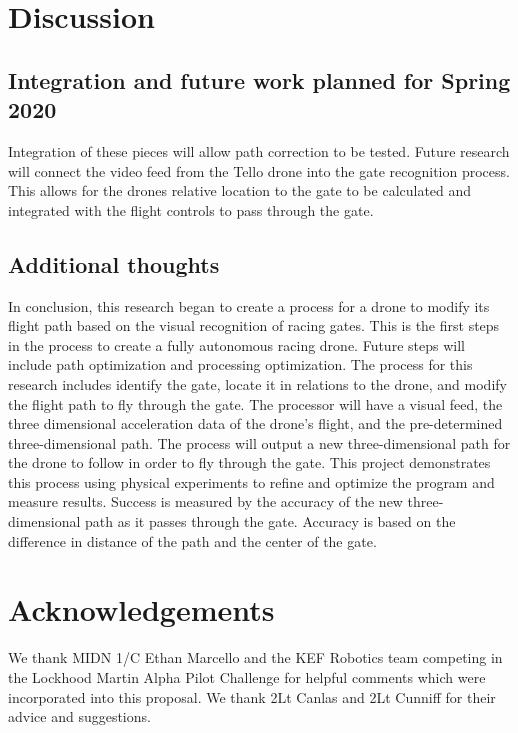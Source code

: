 \documentclass[onecolumn,10pt]{IEEEtran}
\begin{document}
\section{Discussion}
\subsection{Integration and future work planned for Spring 2020}
Integration of these pieces will allow path correction to be tested. Future research will connect the video feed from the Tello drone into the gate recognition process. This allows for the drones relative location to the gate to be calculated and integrated with the flight controls to pass through the gate.

\subsection{Additional thoughts}
In conclusion, this research began to create a process for a drone to modify its flight path based on the visual recognition of racing gates. This is the first steps in the process to create a fully autonomous racing drone. Future steps will include path optimization and processing optimization. The process for this research includes identify the gate, locate it in relations to the drone, and modify the flight path to fly through the gate. The processor will have a visual feed, the three dimensional acceleration data of the drone’s flight, and the pre-determined three-dimensional path. The process will output a new three-dimensional path for the drone to follow in order to fly through the gate. This project demonstrates this process using physical experiments to refine and optimize the program and measure results. Success is measured by the accuracy of the new three-dimensional path as it passes through the gate. Accuracy is based on the difference in distance of the path and the center of the gate. 





\section*{Acknowledgements}
We thank MIDN 1/C Ethan Marcello and the KEF Robotics team competing in the Lockhood Martin Alpha Pilot Challenge for helpful comments which were incorporated into this proposal. We thank 2Lt Canlas and 2Lt Cunniff for their advice and suggestions.
\end{document}
